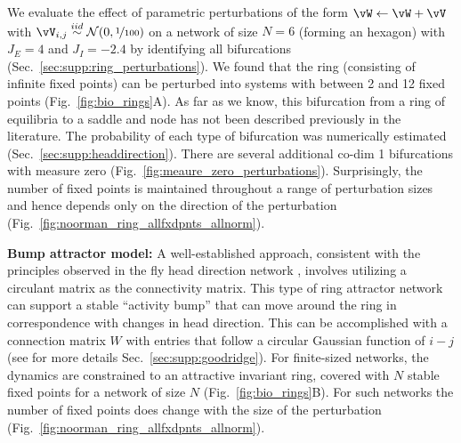 \documentclass{article} %
\newcommand{\ptitle}[1]{\textbf{#1:}\xspace}
\newcounter{ct}
\newcommand{\iidsample}{\stackrel{iid}{\sim}}
\theoremstyle{definition}
\theoremstyle{remark}
\begin{document}
We evaluate the effect of parametric perturbations of the form \( \vW \leftarrow \vW + \vV\) with \(\vV_{i,j}\iidsample\mathcal{N}(0,\nicefrac{1}{100})\) on a network of size \(N = 6\) (forming an hexagon) with \(J_E= 4\) and \(J_I=-2.4\) by identifying all bifurcations (Sec.~\ref{sec:supp:ring_perturbations}).
We found that the ring (consisting of infinite fixed points) can be perturbed into systems with between 2 and 12 fixed points (Fig.~\ref{fig:bio_rings}A).
As far as we know, this bifurcation from a ring of equilibria to a saddle and node has not been described previously in the literature.
The probability of each type of bifurcation was numerically estimated (Sec.~\ref{sec:supp:headdirection}).
There are several additional co-dim 1 bifurcations with measure zero (Fig.~\ref{fig:meaure_zero_perturbations}).
Surprisingly, the number of fixed points is maintained throughout a range of perturbation sizes and hence depends only on the direction of the perturbation (Fig.~\ref{fig:noorman_ring_allfxdpnts_allnorm}).


\ptitle{Bump attractor model}
A well-established approach, consistent with the principles observed in the fly head direction network \citep{kakaria2017}, involves utilizing a circulant matrix as the connectivity matrix\citep{benyishai1995theory,samsonovich1997path}.
This type of ring attractor network can support a stable ``activity bump'' that can move around the ring in correspondence with changes in head direction.
This can be accomplished with a connection matrix \(W\) with entries that follow a circular Gaussian function of \(i-j\) \citep{seeholzer2017efficient,redish1996coupled,goodridge2000,compte2000synaptic} (see for more details Sec.~\ref{sec:supp:goodridge}).
For finite-sized networks, the dynamics are constrained to an attractive invariant ring, covered with \(N\) stable fixed points for a network of size \(N\) (Fig.~\ref{fig:bio_rings}B).
For such networks the number of fixed points does change with the size of the perturbation (Fig.~\ref{fig:noorman_ring_allfxdpnts_allnorm}).
\end{document}
